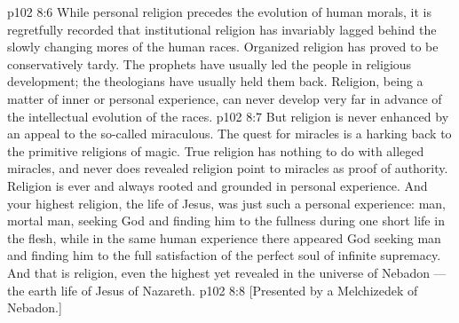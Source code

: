 \vs p102 8:6 While personal religion precedes the evolution of human morals, it is regretfully recorded that institutional religion has invariably lagged behind the slowly changing mores of the human races. Organized religion has proved to be conservatively tardy. The prophets have usually led the people in religious development; the theologians have usually held them back. Religion, being a matter of inner or personal experience, can never develop very far in advance of the intellectual evolution of the races.
\vs p102 8:7 But religion is never enhanced by an appeal to the so\hyp{}called miraculous. The quest for miracles is a harking back to the primitive religions of magic. True religion has nothing to do with alleged miracles, and never does revealed religion point to miracles as proof of authority. Religion is ever and always rooted and grounded in personal experience. And your highest religion, the life of Jesus, was just such a personal experience: man, mortal man, seeking God and finding him to the fullness during one short life in the flesh, while in the same human experience there appeared God seeking man and finding him to the full satisfaction of the perfect soul of infinite supremacy. And that is religion, even the highest yet revealed in the universe of Nebadon --- the earth life of Jesus of Nazareth.
\vsetoff
\vs p102 8:8 [Presented by a Melchizedek of Nebadon.]
\quizlink

